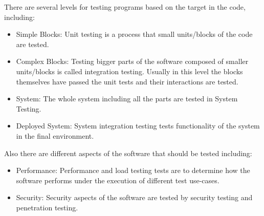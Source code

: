 \documentclass[12pt,a4paper]{report}
\begin{document}
There are several levels for testing programs based on the target in the code, including:
\begin{itemize}
 \item Simple Blocks: Unit testing is a process that small units/blocks of the code are tested.
 \item Complex Blocks: Testing bigger parts of the software composed of smaller units/blocks is called integration testing. Usually in this level the
 blocks themselves have passed the unit tests and their interactions are tested.
 \item System: The whole system including all the parts are tested in System Testing. 
 \item Deployed System: System integration testing tests functionality of the system in the final environment.
\end{itemize}
Also there are different aspects of the software that should be tested including:
\begin{itemize}
 \item Performance: Performance and load testing tests are to determine how the software performs under the execution of different test use-cases.
 \item Security: Security aspects of the software are tested by security testing and penetration testing.
\end{itemize}
\end{document}
